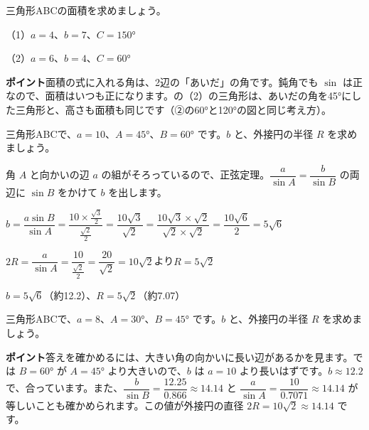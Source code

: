 \begin{jibun}
三角形ABCの面積を求めましょう。\par
（1）$a=4$、$b=7$、$C=\ang{150}$\par
（2）$a=6$、$b=4$、$C=\ang{60}$
\end{jibun}
\textbf{ポイント}\quad 面積の式に入れる角は、2辺の「あいだ」の角です。鈍角でも $\sin$ は正なので、面積はいつも正になります。の（2）の三角形は、あいだの角を\ang{45}にした三角形と、高さも面積も同じです（②の\ang{60}と\ang{120}の図と同じ考え方）。

\begin{reidai}[正弦定理で辺と外接円の半径]
三角形ABCで、$a=10$、$A=\ang{45}$、$B=\ang{60}$ です。$b$ と、外接円の半径 $R$ を求めましょう。\par
\kangaekata 角 $A$ と向かいの辺 $a$ の組がそろっているので、正弦定理。$\dfrac{a}{\sin A}=\dfrac{b}{\sin B}$ の両辺に $\sin B$ をかけて $b$ を出します。\par
\shiki $b=\dfrac{a\sin B}{\sin A}=\dfrac{10\times\frac{\sqrt3}{2}}{\frac{\sqrt2}{2}}=\dfrac{10\sqrt3}{\sqrt2}=\dfrac{10\sqrt3\times\sqrt2}{\sqrt2\times\sqrt2}=\dfrac{10\sqrt6}{2}=5\sqrt6$\par
\hspace*{2.6\zw}$2R=\dfrac{a}{\sin A}=\dfrac{10}{\frac{\sqrt2}{2}}=\dfrac{20}{\sqrt2}=10\sqrt2$\quad より\quad $R=5\sqrt2$\par
\kotae $b=5\sqrt6$（約12.2）、$R=5\sqrt2$（約7.07）
\end{reidai}

\begin{jibun}
三角形ABCで、$a=8$、$A=\ang{30}$、$B=\ang{45}$ です。$b$ と、外接円の半径 $R$ を求めましょう。
\end{jibun}
\textbf{ポイント}\quad 答えを確かめるには、大きい角の向かいに長い辺があるかを見ます。では $B=\ang{60}$ が $A=\ang{45}$ より大きいので、$b$ は $a=10$ より長いはずです。$b\approx12.2$ で、合っています。また、$\dfrac{b}{\sin B}=\dfrac{12.25}{0.866}\approx14.14$ と $\dfrac{a}{\sin A}=\dfrac{10}{0.7071}\approx14.14$ が等しいことも確かめられます。この値が外接円の直径 $2R=10\sqrt2\approx14.14$ です。

